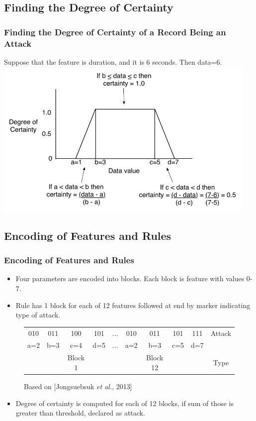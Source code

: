 \documentclass{beamer}
\begin{document}
\subsection{Finding the Degree of Certainty}
\begin{frame}
  \frametitle{Finding the Degree of Certainty of a Record Being an Attack}
	Suppose that the feature is duration, and it is 6 seconds. Then data=6.
  \includegraphics[width=0.95\textwidth]{../trapFigExample.pdf}
\end{frame}


\subsection{Encoding of Features and Rules}
\begin{frame}
	\frametitle{Encoding of Features and Rules}
	\begin{itemize}
	\item Four parameters are encoded into blocks. Each block is feature with values 0-7.
	\item Rule has 1 block for each of 12 features followed at end by marker indicating type of attack.
	\end{itemize}

\begin{figure}
\begin{small}
\begin{tabular}{|cccc|c|cccc|c|} \hline
010 & 011 & 100 & 101   & ... & 010 & 011 & 101 & 111   & Attack\\
a=2 & b=3 & c=4 & d=5   & ... & a=2 & b=3 & c=5 & d=7   &\\ 
    &     & Block 1&    &        &     & Block 12& &       & Type\\
\hline\end{tabular}
\caption{Based on [Jongsuebsuk \emph{et al.}, 2013]}
\end{small}
\end{figure}

	\begin{itemize}
		\item Degree of certainty is computed for each of 12 blocks, if sum of those is greater than threshold, declared as attack.
	\end{itemize}

\end{frame}
\end{document}
